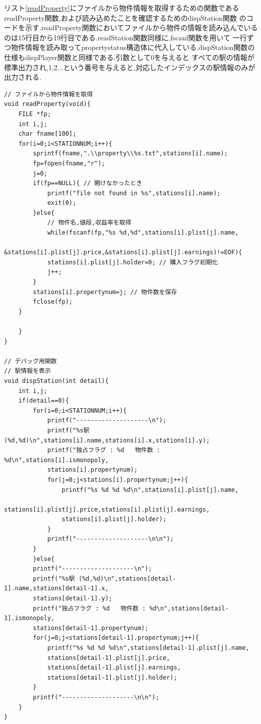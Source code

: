 \documentclass[a4j]{jarticle}
\begin{document}
    リスト\ref{readProperty}にファイルから物件情報を取得するための関数であるreadProperty関数,および読み込めたことを確認するためのdispStation関数
    のコードを示す.readProperty関数においてファイルから物件の情報を読み込んでいるのは15行目から19行目である.readStation関数同様に,fscanf関数を用いて
    一行ずつ物件情報を読み取ってpropertystatus構造体に代入している.dispStation関数の仕様もdispPlayer関数と同様である.引数として0を与えると
    すべての駅の情報が標準出力され,1,2$\dots$という番号を与えると,対応したインデックスの駅情報のみが出力される.
    \begin{lstlisting}[basicstyle=\ttfamily\footnotesize, frame=single,label=readProperty,caption=readProperty関数とdispStation関数]
// ファイルから物件情報を取得
void readProperty(void){
    FILE *fp;
    int i,j;
    char fname[100];
    for(i=0;i<STATIONNUM;i++){
        sprintf(fname,".\\property\\%s.txt",stations[i].name);
        fp=fopen(fname,"r");
        j=0;
        if(fp==NULL){ // 開けなかったとき
            printf("file not found in %s",stations[i].name);
            exit(0);
        }else{
            // 物件名,値段,収益率を取得
            while(fscanf(fp,"%s %d,%d",stations[i].plist[j].name,
            &stations[i].plist[j].price,&stations[i].plist[j].earnings)!=EOF){
            stations[i].plist[j].holder=0; // 購入フラグ初期化
            j++;
        }
        stations[i].propertynum=j; // 物件数を保存
        fclose(fp);
    }

    }   
}

// デバッグ用関数	
// 駅情報を表示	
void dispStation(int detail){	
    int i,j;	
    if(detail==0){	
        for(i=0;i<STATIONNUM;i++){	
            printf("--------------------\n");	
            printf("%s駅 (%d,%d)\n",stations[i].name,stations[i].x,stations[i].y);	
            printf("独占フラグ : %d   物件数 : %d\n",stations[i].ismonopoly,
            stations[i].propertynum);	
            for(j=0;j<stations[i].propertynum;j++){	
                printf("%s %d %d %d\n",stations[i].plist[j].name,
                stations[i].plist[j].price,stations[i].plist[j].earnings,
                stations[i].plist[j].holder);	
            }	
            printf("--------------------\n\n");	
        }	
        }else{	
        printf("--------------------\n");	
        printf("%s駅 (%d,%d)\n",stations[detail-1].name,stations[detail-1].x,
        stations[detail-1].y);	
        printf("独占フラグ : %d   物件数 : %d\n",stations[detail-1].ismonopoly,
        stations[detail-1].propertynum);	
        for(j=0;j<stations[detail-1].propertynum;j++){	
            printf("%s %d %d %d\n",stations[detail-1].plist[j].name,
            stations[detail-1].plist[j].price,
            stations[detail-1].plist[j].earnings,
            stations[detail-1].plist[j].holder);	
        }	
        printf("--------------------\n\n");     	
    }	
}
    \end{lstlisting} 
\end{document}
